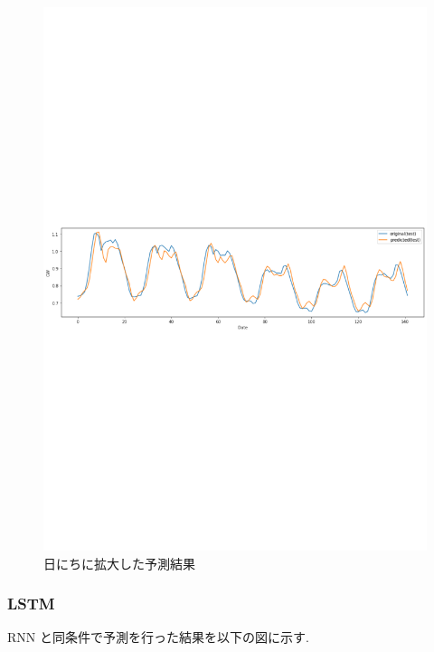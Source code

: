 \begin{figure}[hb]
\begin{center}
\includegraphics[scale=0.8]{rnn_pred_day.pdf}
 \caption{日にちに拡大した予測結果}
\end{center}
\end{figure}

\subsubsection{LSTM}
RNN と同条件で予測を行った結果を以下の図に示す.

